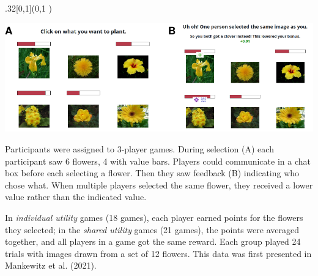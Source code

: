 \documentclass[10pt, xcolor=table, dvipsnames]{beamer}
\begin{document}
	\begin{textblock}{.32}[0,1](0,1 )
		\begin{tcolorbox}[title={\centering Experimental design }]
\vspace{.5em}
			
			\includegraphics[clip,width=\textwidth]{interface-1.pdf}
			
			\vspace{.5em}
			\begin{small}
				
				Participants were assigned to 3-player games. 
				 During selection (A) each participant saw 6 flowers, 4 with value bars. Players could communicate in a chat box before each selecting a flower. Then they saw feedback (B) indicating who chose what.  When multiple players selected the same flower, they received a lower value rather than the indicated value. 

\vspace{.5em}

				In \emph{individual utility} games (18 games), each player earned points for the
				flowers they selected; in the \emph{shared utility} games (21 games), the points
				were averaged together, and all players in a game got the same reward.
								Each group played 24 trials with images drawn from a set of 12 flowers. This data was first presented in  Mankewitz et al. (2021).
								
							
								
			\end{small}
		
		\vspace{.5em}
		\end{tcolorbox}
	\end{textblock}
	
\end{document}
